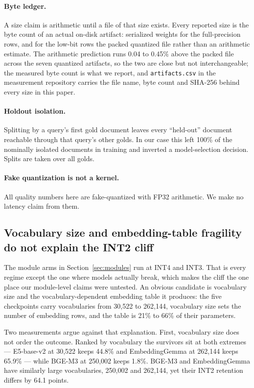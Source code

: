 \documentclass[11pt]{article}
\begin{document}
\paragraph{Byte ledger.} A size claim is arithmetic until a file of that size exists. Every
reported size is the byte count of an actual on-disk artifact: serialized weights for the
full-precision rows, and for the low-bit rows the packed quantized file rather than an
arithmetic estimate. The arithmetic prediction runs 0.04 to 0.45\% above the packed file across the seven quantized artifacts, so the two are close but not interchangeable; the measured byte count is what we report, and \texttt{artifacts.csv} in the measurement repository carries the file name, byte count and SHA-256 behind every size in this paper.

\paragraph{Holdout isolation.} Splitting by a query's first gold document leaves every
``held-out'' document reachable through that query's other golds. In our case this left
100\% of the nominally isolated documents in training and inverted a model-selection
decision. Splits are taken over all golds.

\paragraph{Fake quantization is not a kernel.} All quality numbers here are fake-quantized
with FP32 arithmetic. We make no latency claim from them.

\subsection{Vocabulary size and embedding-table fragility do not explain the INT2 cliff}
\label{sec:int2mod}

The module arms in Section~\ref{sec:modules} run at INT4 and INT3. That is every regime
except the one where models actually break, which makes the cliff the one place our
module-level claims were untested. An obvious candidate is vocabulary size and the
vocabulary-dependent embedding table it produces: the five checkpoints carry vocabularies from
30{,}522 to 262{,}144, vocabulary size sets the number of embedding rows, and the table is
21\% to 66\% of their parameters.

Two measurements argue against that explanation. First, vocabulary size does not order the outcome. Ranked by
vocabulary the survivors sit at both extremes --- E5-base-v2 at 30{,}522 keeps 44.8\% and
EmbeddingGemma at 262{,}144 keeps 65.9\% --- while BGE-M3 at 250{,}002 keeps 1.8\%. BGE-M3 and
EmbeddingGemma have similarly large vocabularies, 250{,}002 and 262{,}144, yet their INT2
retention differs by 64.1 points.
\end{document}
